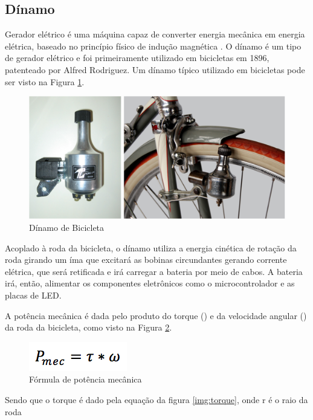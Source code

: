 	\subsection{Dínamo}
	Gerador elétrico é uma máquina capaz de converter energia mecânica em energia elétrica, baseado no princípio físico de indução magnética \cite{maximo}. O dínamo é um tipo de gerador elétrico e foi primeiramente utilizado em bicicletas em 1896, patenteado por Alfred Rodriguez. Um dínamo típico utilizado em bicicletas pode ser visto na Figura \ref{img:dinamo_bicicleta}.
	
	\graphicspath{{figuras/}}
	\begin{figure}[h!]
	\centering
	\includegraphics[scale=0.60]{dinamo_bicicleta}
	\caption{Dínamo de Bicicleta}
	\label{img:dinamo_bicicleta}
	\end{figure}
	
Acoplado à roda da bicicleta, o dínamo utiliza a energia cinética de rotação da roda girando um íma que excitará as bobinas circundantes gerando corrente elétrica, que será retificada e irá carregar a bateria por meio de cabos. A bateria irá, então, alimentar os componentes eletrônicos como o microcontrolador e as placas de LED.

A potência mecânica é dada pelo produto do torque () e da velocidade angular () da roda da bicicleta, como visto na Figura \ref{img:potencia_mecanica}. 

\graphicspath{{figuras/}}
\begin{figure}[h!]
\centering
\includegraphics[scale=1.0]{potencia_mecanica}
\caption{Fórmula de potência mecânica}
\label{img:potencia_mecanica}
\end{figure}

Sendo que o torque é dado pela equação da figura \ref{img:torque}, onde r é o raio da roda

